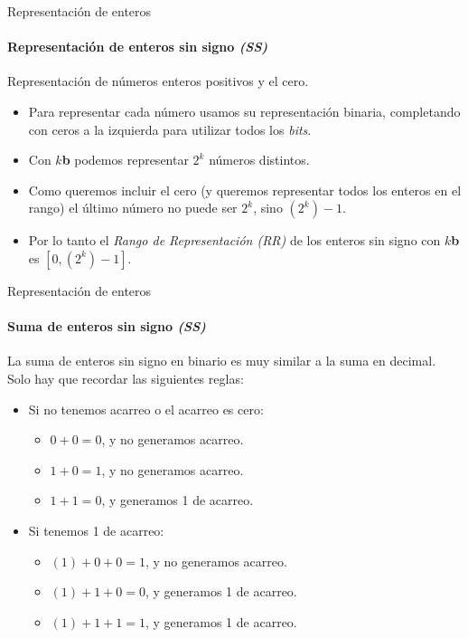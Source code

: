 \documentclass[11pt,a4paper,spanish]{beamer}
\newcommand{\bit}{\textbf{b}}
\begin{document}
\begin{frame}{Representación de enteros}

    \framesubtitle{Representación de enteros sin signo \emph{(SS)}}

    Representación de números enteros positivos y el cero.

    \begin{itemize}
        \item Para representar cada número usamos su representación binaria,
            completando con ceros a la izquierda para utilizar todos los
            \emph{bits}.
        \item Con $k$\bit{} podemos representar $2^{k}$ números distintos.
        \item Como queremos incluir el cero (y queremos representar todos los
            enteros en el rango) el último número no puede ser $2^{k}$, sino
            $(2^{k})-1$.
        \item Por lo tanto el \emph{Rango de Representación (RR)} de los
            enteros sin signo con $k$\bit{} es $[0,(2^{k})-1]$.
    \end{itemize}
\end{frame}

\begin{frame}{Representación de enteros}

    \framesubtitle{Suma de enteros sin signo \emph{(SS)}}

    La suma de enteros sin signo en binario es muy similar a la suma en
    decimal. Solo hay que recordar las siguientes reglas:
    \pause
    \begin{itemize}
        \item Si no tenemos acarreo o el acarreo es cero:
            \begin{itemize}
                \item $0 + 0 = 0$, y no generamos acarreo.
                \item $1 + 0 = 1$, y no generamos acarreo.
                \item $1 + 1 = 0$, y generamos 1 de acarreo.
            \end{itemize}
        \pause
        \item Si tenemos 1 de acarreo:
            \begin{itemize}
                \item $(1) + 0 + 0 = 1$, y no generamos acarreo.
                \item $(1) + 1 + 0 = 0$, y generamos 1 de acarreo.
                \item $(1) + 1 + 1 = 1$, y generamos 1 de acarreo.
            \end{itemize}
    \end{itemize}
\end{frame}
\end{document}
